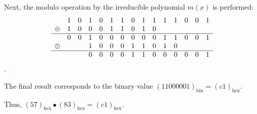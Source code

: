 Next, the modulo operation by the irreducible polynomial $m(x)$ is performed:
\[
\begin{array}{cccccccccccccccc}
    &1&0&1&0&1&1&0&1&1&1&1&0&0&1\\
    \oplus &1&0&0&0&1&1&0&1&0\\
    \hline
    &0&0&1&0&0&0&0&0&0&1&1&0&0&1\\
    \oplus &&&1&0&0&0&1&1&0&1&0\\
    \hline
    &&&0&0&0&0&1&1&0&0&0&0&0&1
\end{array}
\].

The final result corresponds to the binary value $(11000001)_{\text{bin}} = (c1)_{\text{hex}}$.

Thus, $(57)_{\text{hex}} \bullet (83)_{\text{hex}} = (c1)_{\text{hex}}$.